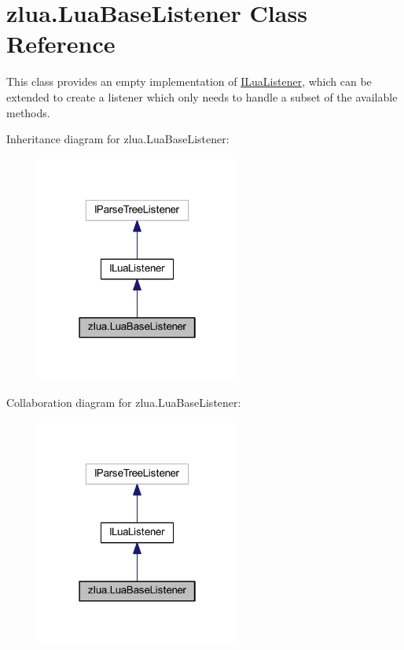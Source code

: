\hypertarget{classzlua_1_1_lua_base_listener}{}\section{zlua.\+Lua\+Base\+Listener Class Reference}
\label{classzlua_1_1_lua_base_listener}


This class provides an empty implementation of \mbox{\hyperlink{interfacezlua_1_1_i_lua_listener}{I\+Lua\+Listener}}, which can be extended to create a listener which only needs to handle a subset of the available methods.  




Inheritance diagram for zlua.\+Lua\+Base\+Listener\+:
\nopagebreak
\begin{figure}[H]
\begin{center}
\leavevmode
\includegraphics[width=190pt]{classzlua_1_1_lua_base_listener__inherit__graph}
\end{center}
\end{figure}


Collaboration diagram for zlua.\+Lua\+Base\+Listener\+:
\nopagebreak
\begin{figure}[H]
\begin{center}
\leavevmode
\includegraphics[width=190pt]{classzlua_1_1_lua_base_listener__coll__graph}
\end{center}
\end{figure}
